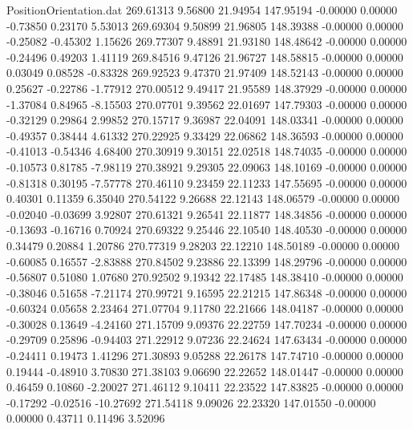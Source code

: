\begin{filecontents}{PositionOrientation.dat}
 269.61313    9.56800   21.94954   147.95194   -0.00000    0.00000   -0.73850    0.23170    5.53013
 269.69304    9.50899   21.96805   148.39388   -0.00000    0.00000   -0.25082   -0.45302    1.15626
 269.77307    9.48891   21.93180   148.48642   -0.00000    0.00000   -0.24496    0.49203    1.41119
 269.84516    9.47126   21.96727   148.58815   -0.00000    0.00000    0.03049    0.08528   -0.83328
 269.92523    9.47370   21.97409   148.52143   -0.00000    0.00000    0.25627   -0.22786   -1.77912
 270.00512    9.49417   21.95589   148.37929   -0.00000    0.00000   -1.37084    0.84965   -8.15503
 270.07701    9.39562   22.01697   147.79303   -0.00000    0.00000   -0.32129    0.29864    2.99852
 270.15717    9.36987   22.04091   148.03341   -0.00000    0.00000   -0.49357    0.38444    4.61332
 270.22925    9.33429   22.06862   148.36593   -0.00000    0.00000   -0.41013   -0.54346    4.68400
 270.30919    9.30151   22.02518   148.74035   -0.00000    0.00000   -0.10573    0.81785   -7.98119
 270.38921    9.29305   22.09063   148.10169   -0.00000    0.00000   -0.81318    0.30195   -7.57778
 270.46110    9.23459   22.11233   147.55695   -0.00000    0.00000    0.40301    0.11359    6.35040
 270.54122    9.26688   22.12143   148.06579   -0.00000    0.00000   -0.02040   -0.03699    3.92807
 270.61321    9.26541   22.11877   148.34856   -0.00000    0.00000   -0.13693   -0.16716    0.70924
 270.69322    9.25446   22.10540   148.40530   -0.00000    0.00000    0.34479    0.20884    1.20786
 270.77319    9.28203   22.12210   148.50189   -0.00000    0.00000   -0.60085    0.16557   -2.83888
 270.84502    9.23886   22.13399   148.29796   -0.00000    0.00000   -0.56807    0.51080    1.07680
 270.92502    9.19342   22.17485   148.38410   -0.00000    0.00000   -0.38046    0.51658   -7.21174
 270.99721    9.16595   22.21215   147.86348   -0.00000    0.00000   -0.60324    0.05658    2.23464
 271.07704    9.11780   22.21666   148.04187   -0.00000    0.00000   -0.30028    0.13649   -4.24160
 271.15709    9.09376   22.22759   147.70234   -0.00000    0.00000   -0.29709    0.25896   -0.94403
 271.22912    9.07236   22.24624   147.63434   -0.00000    0.00000   -0.24411    0.19473    1.41296
 271.30893    9.05288   22.26178   147.74710   -0.00000    0.00000    0.19444   -0.48910    3.70830
 271.38103    9.06690   22.22652   148.01447   -0.00000    0.00000    0.46459    0.10860   -2.20027
 271.46112    9.10411   22.23522   147.83825   -0.00000    0.00000   -0.17292   -0.02516  -10.27692
 271.54118    9.09026   22.23320   147.01550   -0.00000    0.00000    0.43711    0.11496    3.52096

\end{filecontents}
